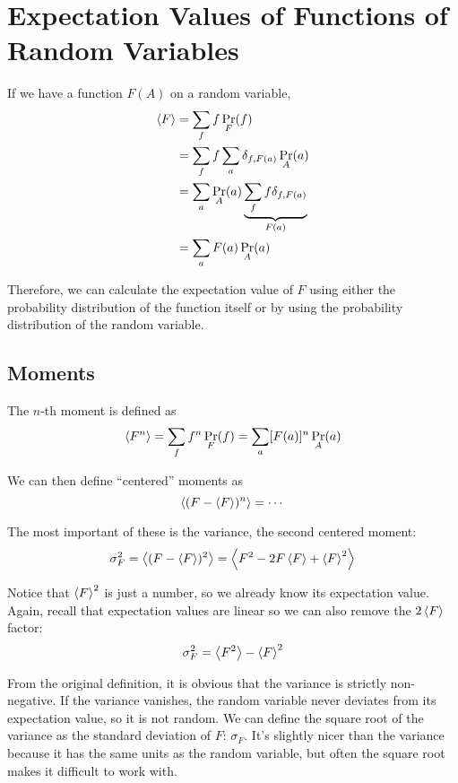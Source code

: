 \documentclass[a4paper,twoside,master.tex]{subfiles}
\begin{document}

\section{Expectation Values of Functions of Random Variables}
\label{sec:expectation_values_of_functions_of_random_variables}

If we have a function $ F(A) $ on a random variable,
\begin{align}
    \ev{F} &= \sum_f f \Pr_{F}(f) \\
    &= \sum_f f \sum_a \delta_{f,F(a)} \Pr_{A}(a) \\
    &= \sum_a \Pr_{A}(a) \underbrace{\sum_f f \delta_{f,F(a)}}_{F(a)} \\
    &= \sum_a F(a) \Pr_{A}(a)
\end{align}

Therefore, we can calculate the expectation value of $ F $ using either the probability distribution of the function itself or by using the probability distribution of the random variable.

\subsection{Moments}
\label{sub:moments}

The $ n $-th moment is defined as
\begin{equation}
    \ev{F^n} = \sum_f f^n \Pr_{F}(f) = \sum_a [F(a)]^n \Pr_{A}(a)
\end{equation}

We can then define ``centered'' moments as
\begin{equation}
    \ev{(F - \ev{F})^n} = \cdots
\end{equation}

The most important of these is the variance, the second centered moment:
\begin{equation}
    \sigma^2_F = \ev{(F - \ev{F})^2} = \ev{F^2 - 2 F \ev{F} + \ev{F}^2}
\end{equation}

Notice that $ \ev{F}^2 $ is just a number, so we already know its expectation value. Again, recall that expectation values are linear so we can also remove the $ 2 \ev{F} $ factor:
\begin{equation}
    \sigma^2_F = \ev{F^2} - \ev{F}^2
\end{equation}

From the original definition, it is obvious that the variance is strictly non-negative. If the variance vanishes, the random variable never deviates from its expectation value, so it is not random. We can define the square root of the variance as the standard deviation of $ F $: $ \sigma_F $. It's slightly nicer than the variance because it has the same units as the random variable, but often the square root makes it difficult to work with.
\end{document}

